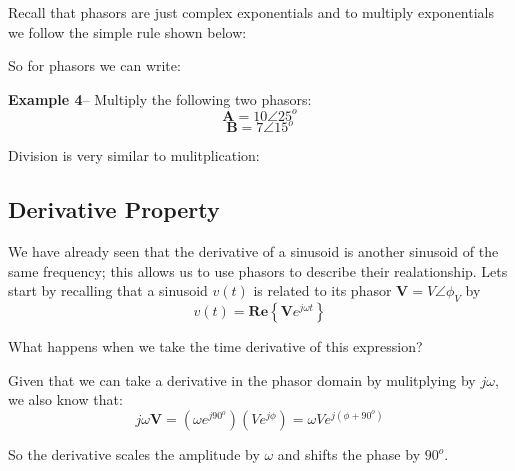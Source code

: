\documentclass{handout}
\begin{document}
Recall that phasors are just complex exponentials and to multiply exponentials we follow the simple rule shown below:
\soln{1in}{
\[
Ae^{j\phi_A} \times Be^{j\phi_B} = ABe^{j(\phi_A+\phi_B)}
\]
}

So for phasors we can write:
\soln{1in}{
\[
A\angle\phi_A \times B\angle \phi_B = AB \angle \left( \phi_A +\phi_B \right)
\]
}

\textbf{Example 4}-- Multiply the following two phasors:
\[
\mathbf{A} = 10\angle 25^o
\]
\[
\mathbf{B} = 7\angle 15^o
\]
\soln{3in}{
\[
\mathbf{AB} = 7 \times 10 \angle \left( 25^o + 15^o\right) = 70\angle 40^o
\]
}

Division is very similar to mulitplication:
\soln{1in}{
\[
\frac{A\angle\phi_A}{B\angle\phi_B} = \frac{A}{B}\angle(\phi_A-\phi_B)
\]
}


\subsection{Derivative Property}
We have already seen that the derivative of a sinusoid is another sinusoid of the same frequency; this allows us to use phasors to describe their realationship.  Lets start by recalling that a sinusoid $v(t)$ is related to its phasor $\mathbf{V} = V\angle \phi_V$ by
\[
v(t) = \mathbf{Re}\left\{ \mathbf{V}e^{j\omega t} \right\}
\]

What happens when we take the time derivative of this expression?

Given that we can take a derivative in the phasor domain by mulitplying by $j\omega$, we also know that:
\[
j\omega\mathbf{V} = \left(\omega e^{j90^o}\right)\left( V e^{j \phi} \right) = \omega  V e^{j (\phi + 90^o) }
\]

So the derivative scales the amplitude by $\omega$ and shifts the phase by $90^o$.
\end{document}
